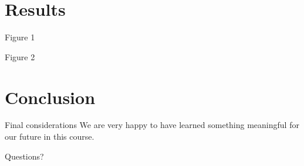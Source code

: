 \documentclass[10pt]{beamer}
\begin{document}
\section[Results]{Results}
\begin{frame}{Figure 1}

\end{frame}

\begin{frame}{Figure 2}

\end{frame}

\section[Conclusion]{Conclusion}
\begin{frame}{Final considerations}
We are very happy to have learned something meaningful for our future in this course.
\end{frame}

{
\begin{frame}[standout]
  Questions?
\end{frame}
}
\end{document}
